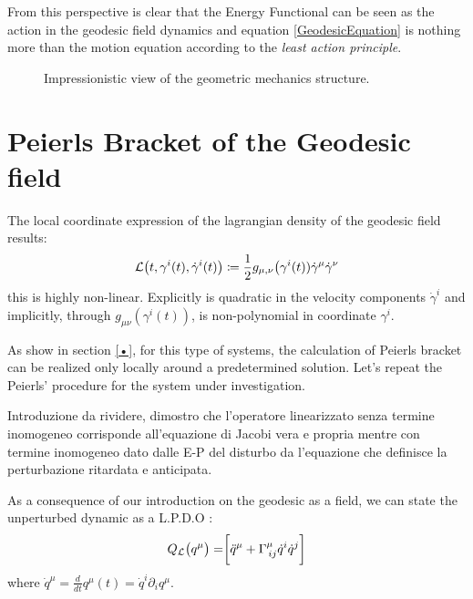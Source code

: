 \documentclass[Main]{subfiles}
\begin{document}
	From this perspective is clear that the Energy Functional can be seen as the action in the geodesic field dynamics and equation \ref{GeodesicEquation} is nothing more than the motion equation according to the \emph{least action principle}.

		\begin{figure}[h!]
				  \centering
   	  \caption{Impressionistic view of the geometric mechanics structure.}
		\end{figure}		


\section{Peierls Bracket of the Geodesic field}
	The local coordinate expression of the lagrangian density of the geodesic field results:
	\begin{equation}
		\mathcal{L}\big(t,\gamma^i(t), \dot{\gamma}^i(t) \big)\coloneqq \frac{1}{2}g_{\mu,\nu}\big(\gamma^i(t))\dot{\gamma}^\mu \dot{\gamma}^\nu
	\end{equation}		
	this is highly non-linear. Explicitly is quadratic in the velocity components $\dot{\gamma}^i$ and implicitly, through $g_{\mu\nu}(\gamma^i(t))$, is non-polynomial in coordinate $\gamma^i$.
	
	As show in section \ref{•}, for this type of systems, the calculation of Peierls bracket can be realized only locally around a predetermined solution.
	Let's repeat the Peierls' procedure for the system under investigation.
	
	\begin{Warning}
	Introduzione da rividere, dimostro che l'operatore linearizzato senza termine inomogeneo corrisponde all'equazione di Jacobi vera e propria mentre con termine inomogeneo dato dalle E-P del disturbo da l'equazione che definisce la perturbazione ritardata e anticipata.
	\end{Warning}

	As a consequence of our introduction on the geodesic as a field, we can state the unperturbed dynamic as a L.P.D.O :
		\begin{equation}
			Q_{\mathcal{L}} \big(q^\mu 	\big)= \biggr[\ddot{q}^\mu + \Gamma^\mu_{\, i j}\dot{q}^i \dot{q}^j	\biggr]
		\end{equation}
	where $\dot{q}^\mu = \frac{d}{dt}q^\mu(t)=\dot{q}^i\partial_i q^\mu$.
	
\end{document}
